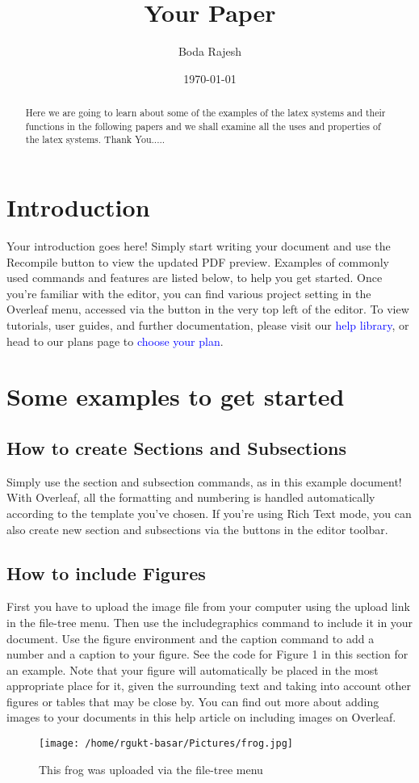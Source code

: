 \documentclass{article}
\title{Your Paper}
\author{Boda Rajesh}
\date{\today}
\begin{document}
\maketitle
\begin{abstract}
	Here we are going to learn about some of the examples of the latex systems and their functions in the following papers and we shall examine all the uses and properties of the latex systems.
       \newline
	    Thank You.....
\end{abstract}
\section{Introduction}
Your introduction goes here! Simply start writing your document and use the Recompile button to
view the updated PDF preview. Examples of commonly used commands and features are listed below,
to help you get started.
Once you’re familiar with the editor, you can find various project setting in the Overleaf menu,
accessed via the button in the very top left of the editor. To view tutorials, user guides, and further
documentation, please visit our \textcolor{blue}{help library}, or head to our plans page to \textcolor{blue}{choose your plan}.
\section{Some examples to get started}
\subsection{How to create Sections and Subsections}
Simply use the section and subsection commands, as in this example document! With Overleaf, all
the formatting and numbering is handled automatically according to the template you’ve chosen. If
you’re using Rich Text mode, you can also create new section and subsections via the buttons in the
editor toolbar.
\subsection{How to include Figures}
First you have to upload the image file from your computer using the upload link in the file-tree menu.
Then use the includegraphics command to include it in your document. Use the figure environment
and the caption command to add a number and a caption to your figure. See the code for Figure 1 in
this section for an example.
Note that your figure will automatically be placed in the most appropriate place for it, given the
surrounding text and taking into account other figures or tables that may be close by. You can find
out more about adding images to your documents in this help article on including images on Overleaf.
\begin{figure}[htbp]
	\centering
	\texttt{[image: /home/rgukt-basar/Pictures/frog.jpg]}
	\caption{This frog was uploaded via the file-tree menu}\label{figure 1:This frog was uploaded via the file-tree menu}
\end{figure}
\end{document}
